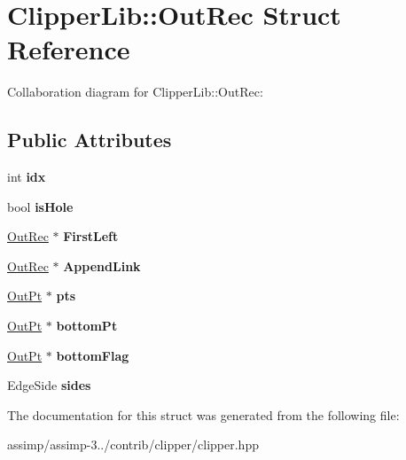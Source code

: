 \hypertarget{struct_clipper_lib_1_1_out_rec}{\section{Clipper\+Lib\+:\+:Out\+Rec Struct Reference}
\label{struct_clipper_lib_1_1_out_rec}
}


Collaboration diagram for Clipper\+Lib\+:\+:Out\+Rec\+:
\subsection*{Public Attributes}
\begin{DoxyCompactItemize}
\item 
\hypertarget{struct_clipper_lib_1_1_out_rec_a86f3792d595bf0b43080973e25530325}{int {\bfseries idx}}\label{struct_clipper_lib_1_1_out_rec_a86f3792d595bf0b43080973e25530325}

\item 
\hypertarget{struct_clipper_lib_1_1_out_rec_a0d3a9a11fb66b802754f7a4709f55ed9}{bool {\bfseries is\+Hole}}\label{struct_clipper_lib_1_1_out_rec_a0d3a9a11fb66b802754f7a4709f55ed9}

\item 
\hypertarget{struct_clipper_lib_1_1_out_rec_aa8baa934f1a7687a16b88a579dec3dd4}{\hyperlink{struct_clipper_lib_1_1_out_rec}{Out\+Rec} $\ast$ {\bfseries First\+Left}}\label{struct_clipper_lib_1_1_out_rec_aa8baa934f1a7687a16b88a579dec3dd4}

\item 
\hypertarget{struct_clipper_lib_1_1_out_rec_aa58c486056bac73cb7a69cb93d51658e}{\hyperlink{struct_clipper_lib_1_1_out_rec}{Out\+Rec} $\ast$ {\bfseries Append\+Link}}\label{struct_clipper_lib_1_1_out_rec_aa58c486056bac73cb7a69cb93d51658e}

\item 
\hypertarget{struct_clipper_lib_1_1_out_rec_a81021383d06dbfb7b247d053205529f2}{\hyperlink{struct_clipper_lib_1_1_out_pt}{Out\+Pt} $\ast$ {\bfseries pts}}\label{struct_clipper_lib_1_1_out_rec_a81021383d06dbfb7b247d053205529f2}

\item 
\hypertarget{struct_clipper_lib_1_1_out_rec_a81695c0c62beef7de4bbb758290ae68d}{\hyperlink{struct_clipper_lib_1_1_out_pt}{Out\+Pt} $\ast$ {\bfseries bottom\+Pt}}\label{struct_clipper_lib_1_1_out_rec_a81695c0c62beef7de4bbb758290ae68d}

\item 
\hypertarget{struct_clipper_lib_1_1_out_rec_a0ce27f4969927fba25919555db85fc07}{\hyperlink{struct_clipper_lib_1_1_out_pt}{Out\+Pt} $\ast$ {\bfseries bottom\+Flag}}\label{struct_clipper_lib_1_1_out_rec_a0ce27f4969927fba25919555db85fc07}

\item 
\hypertarget{struct_clipper_lib_1_1_out_rec_ab303bebacae389c80bda3e65b2a36583}{Edge\+Side {\bfseries sides}}\label{struct_clipper_lib_1_1_out_rec_ab303bebacae389c80bda3e65b2a36583}

\end{DoxyCompactItemize}


The documentation for this struct was generated from the following file\+:\begin{DoxyCompactItemize}
\item 
assimp/assimp-\/3../contrib/clipper/clipper.\+hpp\end{DoxyCompactItemize}
